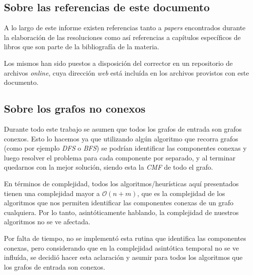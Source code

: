 {}
\subsection*{Sobre las referencias de este documento}
\par A lo largo de este informe existen referencias tanto a \emph{papers}
    encontrados durante la elaboraci\'on de las resoluciones como as\'i
    referencias a cap\'itulos espec\'ificos de libros que son parte de la
    bibliograf\'ia de la materia.

\par Los mismos han sido puestos a disposici\'on del corrector en un repositorio
    de archivos \emph{online}, cuya direcci\'on \emph{web} est\'a inclu\'ida
    en los archivos provistos con este documento.

{}
\subsection*{Sobre los grafos no conexos\label{notas:conexos}}
\par Durante todo este trabajo se asumen que todos los grafos de entrada son
    grafos conexos. Esto lo hacemos ya que utilizando alg\'un algoritmo que recorra
    grafos (como por ejemplo \emph{DFS} o \emph{BFS}) se podr\'ian identificar
    las componentes conexas y luego resolver el problema para cada componente
    por separado, y al terminar quedarnos con la mejor soluci\'on, siendo esta
    la \emph{CMF} de todo el grafo.

\par En t\'erminos de complejidad, todos los algoritmos/heur\'isticas aqu\'i
    presentados tienen una complejidad mayor a $\mathcal O(n+m)$, que es
    la complejidad de los algoritmos que nos permiten identificar las componentes
    conexas de un grafo cualquiera. Por lo tanto, asint\'oticamente hablando,
    la complejidad de nuestros algoritmos no se ve afectada.

\par Por falta de tiempo, no se implement\'o esta rutina que identifica las componentes
    conexas, pero considerando que en la complejidad asint\'otica temporal no se
    ve influ\'ida, se decidi\'o hacer esta aclaraci\'on y asumir para todos los algoritmos que
    los grafos de entrada son conexos.

{}
